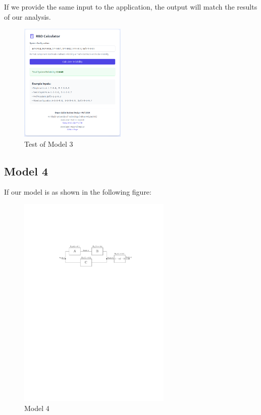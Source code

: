 \documentclass[12pt	]{article}
\begin{document}
If we provide the same input to the application, the output will match the results of our analysis.

\begin{figure}[h]
	\centering
	\includegraphics[width=0.45\textwidth]{Images/img5.png}
	\caption{Test of Model 3}
	\label{fig:Test of Model 3}
\end{figure}

\newpage


\subsection{Model 4}
If our model is as shown in the following figure:

\begin{figure}[h]
	\centering
	\includegraphics[width=0.65\textwidth]{Images/img5.pdf}
	\caption{Model 4}
	\label{fig:Model 4}
\end{figure}
\end{document}
